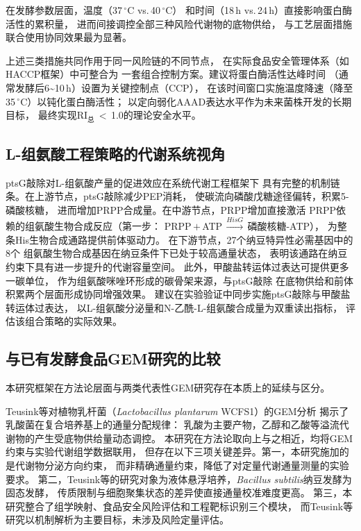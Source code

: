 \documentclass[10pt, a4paper, twocolumn]{ctexart}
\newcommand{\bs}{\textit{Bacillus subtilis}}
\newcommand{\NAH}{N-乙酰-L-组氨酸}
\begin{document}
在发酵参数层面，温度（37\,$^\circ$C vs.\,40\,$^\circ$C）
和时间（18\,h vs.\,24\,h）直接影响蛋白酶活性的累积量，
进而间接调控全部三种风险代谢物的底物供给，
与工艺层面措施联合使用协同效果最为显著。

上述三类措施共同作用于同一风险链的不同节点，
在实际食品安全管理体系（如HACCP框架）中可整合为
一套组合控制方案。建议将蛋白酶活性达峰时间
（通常发酵后6\textasciitilde10\,h）设置为关键控制点（CCP），
在该时间窗口实施温度降速（降至35\,$^\circ$C）以钝化蛋白酶活性；
以定向弱化AAAD表达水平作为未来菌株开发的长期目标，
最终实现RI$_\text{总}$\,$<$\,1.0的理论安全水平。

\subsection{L-组氨酸工程策略的代谢系统视角}

ptsG敲除对L-组氨酸产量的促进效应在系统代谢工程框架下
具有完整的机制链条。在上游节点，ptsG敲除减少PEP消耗，
使碳流向磷酸戊糖途径偏转，积累5-磷酸核糖，
进而增加PRPP合成量。在中游节点，PRPP增加直接激活
PRPP依赖的组氨酸生物合成反应（第一步：
PRPP\,$+$\,ATP\,$\xrightarrow{HisG}$\,磷酸核糖-ATP），
为整条His生物合成通路提供前体驱动力。
在下游节点，27个纳豆特异性必需基因中的8个
组氨酸生物合成基因在纳豆条件下已处于较高通量状态，
表明该通路在纳豆约束下具有进一步提升的代谢容量空间。
此外，甲酸盐转运体过表达可提供更多一碳单位，
作为组氨酸咪唑环形成的碳骨架来源，与ptsG敲除
在底物供给和前体积累两个层面形成协同增强效果。
建议在实验验证中同步实施ptsG敲除与甲酸盐转运体过表达，
以L-组氨酸分泌量和\NAH{}合成量为双重读出指标，
评估该组合策略的实际效果。

\subsection{与已有发酵食品GEM研究的比较}

本研究框架在方法论层面与两类代表性GEM研究存在本质上的延续与区分。

Teusink等对植物乳杆菌（\textit{Lactobacillus plantarum} WCFS1）的GEM分析
\citep{Teusink2006}揭示了乳酸菌在复合培养基上的通量分配规律：
乳酸为主要产物，乙醇和乙酸等溢流代谢物的产生受底物供给量动态调控。
本研究在方法论取向上与之相近，均将GEM约束与实验代谢组学数据联用，
但存在以下三项关键差异。第一，本研究施加的是代谢物分泌方向约束，
而非精确通量约束，降低了对定量代谢通量测量的实验要求。
第二，Teusink等的研究对象为液体悬浮培养，\bs{}纳豆发酵为固态发酵，
传质限制与细胞聚集状态的差异使直接通量校准难度更高。
第三，本研究整合了组学映射、食品安全风险评估和工程靶标识别三个模块，
而Teusink等研究以机制解析为主要目标，未涉及风险定量评估。
\end{document}
